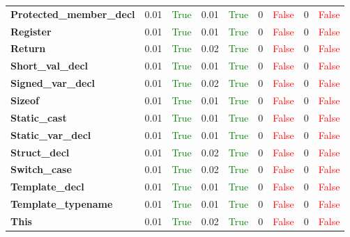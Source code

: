 \documentclass{article}
\begin{document}
\begin{xltabular}{\textwidth}{lcccccccc}
\textbf{{\fontsize{10}{12}\selectfont Protected\_member\_decl}}& 0.01&\textcolor{green}{True}& 0.01&\textcolor{green}{True}& 0&\textcolor{red}{False}& 0&\textcolor{red}{False} \\[0.5ex]
\textbf{{\fontsize{10}{12}\selectfont Register}}& 0.01&\textcolor{green}{True}& 0.01&\textcolor{green}{True}& 0&\textcolor{red}{False}& 0&\textcolor{red}{False} \\[0.5ex]
\textbf{{\fontsize{10}{12}\selectfont Return}}& 0.01&\textcolor{green}{True}& 0.02&\textcolor{green}{True}& 0&\textcolor{red}{False}& 0&\textcolor{red}{False} \\[0.5ex]
\textbf{{\fontsize{10}{12}\selectfont Short\_val\_decl}}& 0.01&\textcolor{green}{True}& 0.01&\textcolor{green}{True}& 0&\textcolor{red}{False}& 0&\textcolor{red}{False} \\[0.5ex]
\textbf{{\fontsize{10}{12}\selectfont Signed\_var\_decl}}& 0.01&\textcolor{green}{True}& 0.02&\textcolor{green}{True}& 0&\textcolor{red}{False}& 0&\textcolor{red}{False} \\[0.5ex]
\textbf{{\fontsize{10}{12}\selectfont Sizeof}}& 0.01&\textcolor{green}{True}& 0.01&\textcolor{green}{True}& 0&\textcolor{red}{False}& 0&\textcolor{red}{False} \\[0.5ex]
\textbf{{\fontsize{10}{12}\selectfont Static\_cast}}& 0.01&\textcolor{green}{True}& 0.01&\textcolor{green}{True}& 0&\textcolor{red}{False}& 0&\textcolor{red}{False} \\[0.5ex]
\textbf{{\fontsize{10}{12}\selectfont Static\_var\_decl}}& 0.01&\textcolor{green}{True}& 0.01&\textcolor{green}{True}& 0&\textcolor{red}{False}& 0&\textcolor{red}{False} \\[0.5ex]
\textbf{{\fontsize{10}{12}\selectfont Struct\_decl}}& 0.01&\textcolor{green}{True}& 0.02&\textcolor{green}{True}& 0&\textcolor{red}{False}& 0&\textcolor{red}{False} \\[0.5ex]
\textbf{{\fontsize{10}{12}\selectfont Switch\_case}}& 0.01&\textcolor{green}{True}& 0.02&\textcolor{green}{True}& 0&\textcolor{red}{False}& 0&\textcolor{red}{False} \\[0.5ex]
\textbf{{\fontsize{10}{12}\selectfont Template\_decl}}& 0.01&\textcolor{green}{True}& 0.01&\textcolor{green}{True}& 0&\textcolor{red}{False}& 0&\textcolor{red}{False} \\[0.5ex]
\textbf{{\fontsize{10}{12}\selectfont Template\_typename}}& 0.01&\textcolor{green}{True}& 0.01&\textcolor{green}{True}& 0&\textcolor{red}{False}& 0&\textcolor{red}{False} \\[0.5ex]
\textbf{{\fontsize{10}{12}\selectfont This}}& 0.01&\textcolor{green}{True}& 0.02&\textcolor{green}{True}& 0&\textcolor{red}{False}& 0&\textcolor{red}{False} \\[0.5ex]

\end{xltabular}
\end{document}
